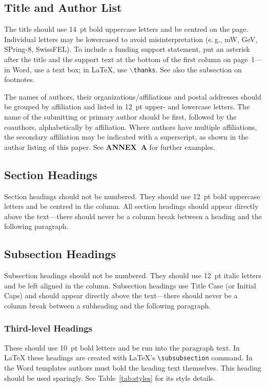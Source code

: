\subsection{Title and Author List}

The title should use \SI{14}{pt} bold uppercase letters and be centred on the page.
Individual letters may be lowercased to avoid misinterpretation (e.\,g., mW, GeV, 
SPring-8, SwissFEL).
To include a funding support statement, put an asterisk after the title and
the support text at the bottom of the first column on page~1---in Word,
use a text box; in \LaTeX, use $\backslash$\texttt{thanks}. See also the
subsection on footnotes.

The names of authors, their organizations/affiliations and
postal addresses should be grouped by affiliation and
listed in \SI{12}{pt} upper- and lowercase letters. The name of
the submitting or primary author should be first, followed
by the coauthors, alphabetically by affiliation. Where
authors have multiple affiliations, the secondary affiliation
may be indicated with a superscript, as shown in the
author listing of this paper. See \textbf{ANNEX~A} for further examples.

\subsection{Section Headings}

Section headings should not be numbered. They should
use  \SI{12}{pt}  bold  uppercase  letters  and  be  centred  in  the
column. All section headings should appear directly above
the text---there should never be a column break between a heading and the
following paragraph.

\subsection{Subsection Headings}

Subsection  headings  should  not  be  numbered.
They should use \SI{12}{pt} italic letters and be left aligned in the column.
Subsection headings use Title Case (or Initial Caps)
and should appear directly above the text---there should never be a column break
between a subheading and the following paragraph.

\subsubsection{Third-level Headings} These should use \SI{10}{pt} bold
letters and be run into the paragraph text. In \LaTeX{} these headings are
created with \LaTeX's \verb|\subsubsection| command.
In the Word templates authors must bold the heading text themselves.
This heading should be used sparingly. See Table~\ref{tab:styles}
for its style details.

